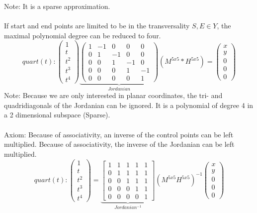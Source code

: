 \documentclass[a4paper,portrait]{report}
\begin{document}
Note: It is a sparse approximation.\\\\
If start and end points are limited to be in the transversality $S,E \in Y$, the maximal polynomial degree can be reduced to four.
\begin{equation}
quart(t):
\begin{pmatrix}
1 \\ t \\ t^2 \\ t^3 \\ t^4
\end{pmatrix}
\underbrace{\begin{pmatrix}
1 & -1 & 0 & 0 & 0\\
0 & 1 & -1 & 0 & 0\\
0 & 0 &1 & -1 & 0\\
0 & 0 & 0 & 1 & -1\\
0 & 0 & 0 & 0 & 1
\end{pmatrix}}_{Jordanian}
(M^{5x5}*H^{5x5})
=
\begin{pmatrix}
x \\ y \\ 0 \\ 0 \\ 0
\end{pmatrix}
\end{equation}
Note: Because we are only interested in planar coordinates, the tri- and quadridiagonals of the Jordanian can be ignored. It is a polynomial of degree 4 in a 2 dimensional subspace (Sparse).\\\\
Axiom: Because of associativity, an inverse of the control points can be left multiplied. Because of associativity, the inverse of the Jordanian can be left multiplied.
\begin{equation}
quart(t):
\begin{pmatrix}
1 \\ t \\ t^2 \\ t^3 \\ t^4
\end{pmatrix}
=
\underbrace{\begin{bmatrix}
1 & 1 & 1 & 1 & 1\\
0 & 1 & 1 & 1 & 1\\
0 & 0 & 1 & 1 & 1\\
0 & 0 & 0 & 1 & 1\\
0 & 0 & 0 & 0 & 1
\end{bmatrix}}_{Jordanian^{-1}}
(M^{5x5}H^{5x5})^{-1}
\begin{pmatrix}
x \\ y \\ 0 \\ 0 \\ 0
\end{pmatrix}
\end{equation}
\end{document}
